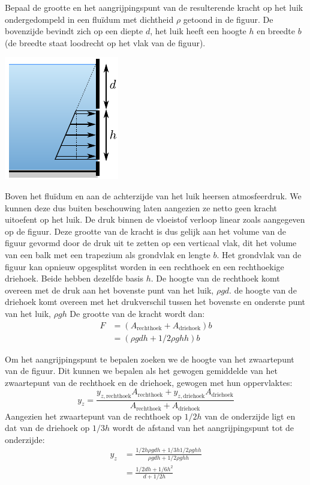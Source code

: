 \begin{voorbeeld}
	\label{vb:kracht op luik}
	Bepaal de grootte en het aangrijpingspunt van de resulterende kracht op het luik ondergedompeld in een fluïdum met dichtheid $\rho$ getoond in de figuur. De bovenzijde bevindt zich op een diepte $d$, het luik heeft een hoogte $h$ en breedte $b$ (de breedte staat loodrecht op het vlak van de figuur).
	\begin{center}
		\includegraphics{fig/hydrostatica/kracht_op_luik}
	\end{center}
	Boven het fluïdum en aan de achterzijde van het luik heersen atmosfeerdruk. We kunnen deze dus buiten beschouwing laten aangezien ze netto geen kracht uitoefent op het luik. De druk binnen de vloeistof verloop linear zoals aangegeven op de figuur. Deze grootte van de kracht is dus gelijk aan het volume van de figuur gevormd door de druk uit te zetten op een verticaal vlak, dit het volume van een balk met een trapezium als grondvlak en lengte $b$. Het grondvlak van de figuur kan opnieuw opgesplitst worden in een rechthoek en een rechthoekige driehoek. Beide hebben dezelfde basis $h$. De hoogte van de rechthoek komt overeen met de druk aan het bovenste punt van het luik, $\rho g d$. de hoogte van de driehoek komt overeen met het drukverschil tussen het bovenste en onderste punt van het luik, $\rho g h$ De grootte van de kracht wordt dan:
	\begin{align*}
		F &= \left( A_{\text{rechthoek}} + A_{\text{driehoek}} \right) b\\
		  &= \left( \rho g d h + 1/2 \rho g h h \right) b
	\end{align*}

	Om het aangrijpingspunt te bepalen zoeken we de hoogte van het zwaartepunt van de figuur. Dit kunnen we bepalen als het gewogen gemiddelde van het zwaartepunt van de rechthoek en de driehoek, gewogen met hun oppervlaktes:
	\begin{equation*}
		y_z = \frac{ y_{z,\text{rechthoek}} A_{\text{rechthoek}} + y_{z,\text{driehoek}} A_{\text{driehoek}}}{A_{\text{rechthoek}} + A_{\text{driehoek}}}
	\end{equation*}
	Aangezien het zwaartepunt van de rechthoek op $1/2 h$ van de onderzijde ligt en dat van de driehoek op $1/3 h$ wordt de afstand van het aangrijpingspunt tot de onderzijde:
	\begin{align*}
		y_z &= \frac{ 1/2 h \rho g d h + 1/3 h 1/2 \rho g h h}{\rho g d h + 1/2 \rho g h h} \\
		    &= \frac{ 1/2 d h + 1/6 h^2}{d + 1/2 h}
	\end{align*}
\end{voorbeeld}

